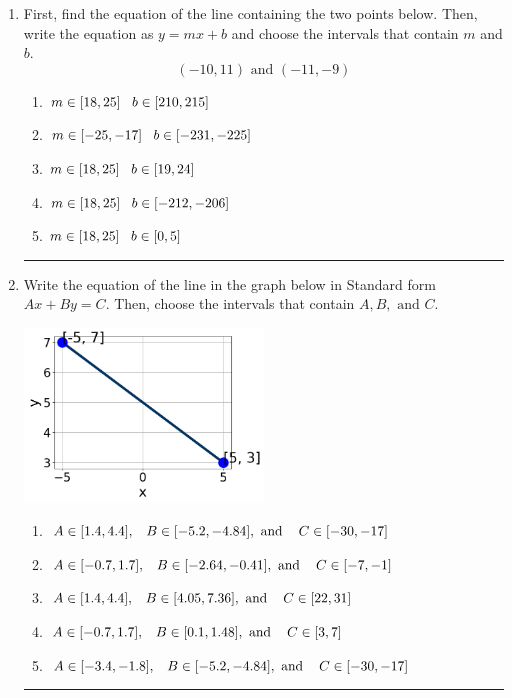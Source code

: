 \documentclass[14pt]{extbook}
\newcommand{\litem}[1]{\item#1\hspace*{-1cm}\rule{\textwidth}{0.4pt}}
\begin{document}
\begin{enumerate}
{\begin{enumerate}[label=\Alph*.]
\end{enumerate} }
\litem{
First, find the equation of the line containing the two points below. Then, write the equation as $ y=mx+b $ and choose the intervals that contain $m$ and $b$.\[ (-10, 11) \text{ and } (-11, -9) \]\begin{enumerate}[label=\Alph*.]
\item \( m \in [18, 25] \hspace*{3mm} b \in [210, 215] \)
\item \( m \in [-25, -17] \hspace*{3mm} b \in [-231, -225] \)
\item \( m \in [18, 25] \hspace*{3mm} b \in [19, 24] \)
\item \( m \in [18, 25] \hspace*{3mm} b \in [-212, -206] \)
\item \( m \in [18, 25] \hspace*{3mm} b \in [0, 5] \)

\end{enumerate} }
\litem{
Write the equation of the line in the graph below in Standard form $Ax+By=C$. Then, choose the intervals that contain $A, B, \text{ and } C$.
\begin{center}
    \includegraphics[width=0.5\textwidth]{../Figures/linearGraphToStandardCopyC.png}
\end{center}
\begin{enumerate}[label=\Alph*.]
\item \( A \in [1.4, 4.4], \hspace{3mm} B \in [-5.2, -4.84], \text{ and } \hspace{3mm} C \in [-30, -17] \)
\item \( A \in [-0.7, 1.7], \hspace{3mm} B \in [-2.64, -0.41], \text{ and } \hspace{3mm} C \in [-7, -1] \)
\item \( A \in [1.4, 4.4], \hspace{3mm} B \in [4.05, 7.36], \text{ and } \hspace{3mm} C \in [22, 31] \)
\item \( A \in [-0.7, 1.7], \hspace{3mm} B \in [0.1, 1.48], \text{ and } \hspace{3mm} C \in [3, 7] \)
\item \( A \in [-3.4, -1.8], \hspace{3mm} B \in [-5.2, -4.84], \text{ and } \hspace{3mm} C \in [-30, -17] \)


\end{enumerate}}
\end{enumerate}
\end{document}
